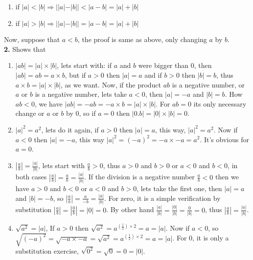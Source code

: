 \documentclass{amsart}
\begin{document}
\begin{enumerate}
\begin{center}
\begin{enumerate}
    \item if $|a|<|b| \Rightarrow ||a|-|b||<|a-b|=|a|+|b|$
    \item if $|a|>|b| \Rightarrow ||a|-|b||=|a-b|=|a|+|b|$
\end{enumerate}
\end{center}
\end{enumerate}
Now, suppose that $a<b$, the proof is same as above, only changing $a$ by $b$.\\

\textbf{2.} Shows that
    \begin{enumerate}
        \item $|ab|=|a|\times|b|$, lets start with: if $a$ and $b$ were bigger than $0$, then $|ab|=ab=a\times b$, but if $a>0$ then $|a|=a$ and if $b>0$ then $|b|=b$, thus $a\times b=|a|\times|b|$, as we want. Now, if the product $ab$ is a negative number, or $a$ or $b$ is a negative number, lets take $a<0$, then $|a|=-a$ and $|b|=b$. How $ab<0$, we have $|ab|=-ab=-a\times b=|a|\times|b|$. For $ab=0$ its only necessary change or $a$ or $b$ by $0$, so if $a=0$ then $|0.b|=|0|\times|b|=0$.
        \item $|a|^2=a^2$, lets do it again, if $a>0$ then $|a|=a$, this way, $|a|^2=a^2$. Now if $a<0$ then $|a|=-a$, this way $|a|^2=(-a)^2=-a\times-a=a^2$. It's obvious for $a=0$.
        \item $|\frac{a}{b}|=\frac{|a|}{|b|}$, lets start with $\frac{a}{b}>0$, thus $a>0$ and $b>0$ or $a<0$ and $b<0$, in both cases $|\frac{a}{b}|=\frac{a}{b}=\frac{|a|}{|b|}$. If the division is a negative number $\frac{a}{b}<0$ then we have $a>0$ and $b<0$ or $a<0$ and $b>0$, lets take the first one, then $|a|=a$ and $|b|=-b$, so $|\frac{a}{b}|=\frac{a}{-b}=\frac{|a|}{|b|}$. For zero, it is a simple verification by substitution $|\frac{a}{b}|=|\frac{0}{b}|=|0|=0$. By other hand $\frac{|a|}{|b|}=\frac{|0|}{|b|}=\frac{0}{|b|}=0$, thus $|\frac{a}{b}|=\frac{|a|}{|b|}$.
        \item $\sqrt{a^2}=|a|$, If $a>0$ then $\sqrt{a^2}=a^{(\frac{1}{2})\times2}=a=|a|$. Now if $a<0$, so $\sqrt{(-a)^2}=\sqrt{-a\times-a}=\sqrt{a^2}=a^{(\frac{1}{2})\times2}=a=|a|$. For 0, it is only a substitution exercise, $\sqrt{0^2}=\sqrt{0}=0=|0|$.
    \end{enumerate}
\end{document}
